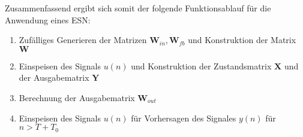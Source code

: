 Zusammenfassend ergibt sich somit der folgende Funktionsablauf für die Anwendung eines \textsc{ESN}:

\singlespacing
\begin{enumerate}
	\item Zufälliges Generieren der Matrizen $\mathbf{W}_{in}, \mathbf{W}_{fb}$ und Konstruktion der Matrix $\mathbf{W}$ 
	\item Einspeisen des Signals $u(n)$ und Konstruktion der Zustandsmatrix $\mathbf{X}$ und der Ausgabematrix $\mathbf{Y}$ 
	\item Berechnung der Ausgabematrix $\mathbf{W}_{out}$
	\item Einspeisen des Signals $u(n)$ für Vorhersagen des Signales $y(n)$ für $n > T + T_0$
\end{enumerate}
\onehalfspacing
